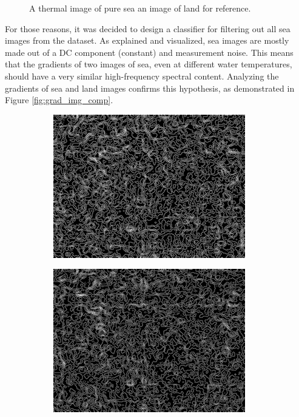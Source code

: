\documentclass[10pt,twocolumn,letterpaper]{article}
\begin{document}
\begin{figure}[ht]
\begin{subfigure}[b]{0.23\textwidth}
        \label{fig:land}
    \end{subfigure}
    \hfill
    \caption{A thermal image of pure sea \vs an image of land for reference.}
    \label{fig:sea_image}
\end{figure}

For those reasons, it was decided to design a classifier for filtering out all sea images from the dataset.
As explained and visualized, sea images are mostly made out of a DC component (constant) and measurement noise.
This means that the gradients of two images of sea, even at different water temperatures, should have a very similar high-frequency spectral content.
Analyzing the gradients of sea and land images confirms this hypothesis, as demonstrated in Figure \ref{fig:grad_img_comp}.
\begin{figure}[ht]
    \begin{subfigure}[b]{0.15\textwidth}
        \centering
        \includegraphics[width=\textwidth]{../figs/data/sea_grad-ref.png}
        \label{fig:sea_grad-ref}
    \end{subfigure}
    \hfill    
    \begin{subfigure}[b]{0.15\textwidth}
        \centering
        \includegraphics[width=\textwidth]{../figs/data/sea_grad.png}

\end{subfigure}
\end{figure}
\end{document}
